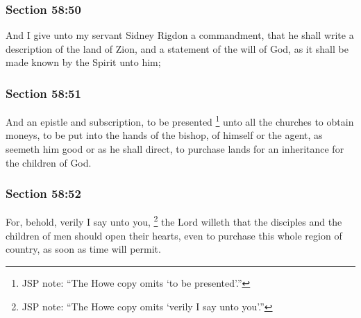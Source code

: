 	\subsubsection{Section 58:50} %
		\label{DC58-50}

		And I give unto my servant Sidney Rigdon a commandment, that he shall write a description of the land of Zion, and a statement of the will of God, as it shall be made known by the Spirit unto him;


	\subsubsection{Section 58:51} %
		\label{DC58-51}

		And an epistle and subscription, to be presented%
			\footnote{%
				JSP note: ``The Howe copy omits `to be presented'.''
				}
		unto all the churches to obtain moneys, to be put into the hands of the bishop, of himself or the agent, as seemeth him good or as he shall direct, to purchase lands for an inheritance for the children of God.


	\subsubsection{Section 58:52} %
		\label{DC58-52}

		For, behold, verily I say unto you,%
			\footnote{%
				JSP note: ``The Howe copy omits `verily I say unto you'.''
				}
		the Lord willeth that the disciples and the children of men should open their hearts, even to purchase this whole region of country, as soon as time will permit.

